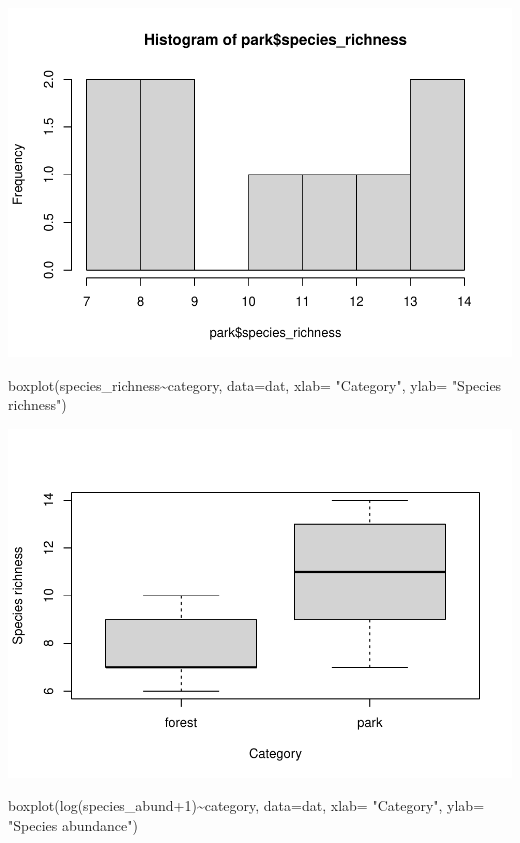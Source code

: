 \documentclass[
]{article}
\newenvironment{Shaded}{\begin{snugshade}}{\end{snugshade}}
\newcommand{\AttributeTok}[1]{\textcolor[rgb]{0.77,0.63,0.00}{#1}}
\newcommand{\DecValTok}[1]{\textcolor[rgb]{0.00,0.00,0.81}{#1}}
\newcommand{\FunctionTok}[1]{\textcolor[rgb]{0.00,0.00,0.00}{#1}}
\newcommand{\NormalTok}[1]{#1}
\newcommand{\SpecialCharTok}[1]{\textcolor[rgb]{0.00,0.00,0.00}{#1}}
\newcommand{\StringTok}[1]{\textcolor[rgb]{0.31,0.60,0.02}{#1}}
\begin{document}
\includegraphics{birdsdataanalysis_files/figure-latex/unnamed-chunk-5-8.pdf}

\begin{Shaded}
\begin{Highlighting}[]
\FunctionTok{boxplot}\NormalTok{(species\_richness}\SpecialCharTok{\textasciitilde{}}\NormalTok{category, }\AttributeTok{data=}\NormalTok{dat, }\AttributeTok{xlab=} \StringTok{"Category"}\NormalTok{, }\AttributeTok{ylab=} \StringTok{"Species richness"}\NormalTok{)}
\end{Highlighting}
\end{Shaded}

\includegraphics{birdsdataanalysis_files/figure-latex/unnamed-chunk-6-1.pdf}

\begin{Shaded}
\begin{Highlighting}[]
\FunctionTok{boxplot}\NormalTok{(}\FunctionTok{log}\NormalTok{(species\_abund}\SpecialCharTok{+}\DecValTok{1}\NormalTok{)}\SpecialCharTok{\textasciitilde{}}\NormalTok{category, }\AttributeTok{data=}\NormalTok{dat, }\AttributeTok{xlab=} \StringTok{"Category"}\NormalTok{, }\AttributeTok{ylab=} \StringTok{"Species abundance"}\NormalTok{)}
\end{Highlighting}
\end{Shaded}
\end{document}
